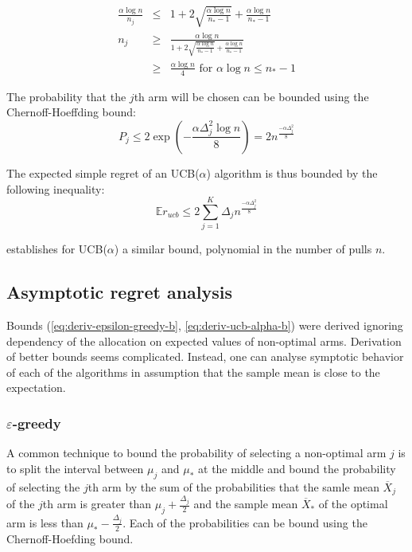 \documentclass{article}
\newcommand {\IE} {\ensuremath {\mathbb{E}}}
\begin{document}
\begin{eqnarray}
\frac {\alpha \log n} {n_j}&\le& 1 + 2  \sqrt {\frac {\alpha \log n}
  {n_*-1}} + \frac {\alpha \log n} {n_*-1}\nonumber\\
n_j &\ge& \frac {\alpha \log n} {1+2 \sqrt {\frac {\alpha \log n}
    {n_*-1}} + \frac {\alpha \log n} {n_*-1}}\nonumber\\
    &\ge& \frac {\alpha \log n} {4} \mbox{ for } \alpha \log n \le n_*-1
\end{eqnarray}

The probability that the $j$th arm will be chosen can be bounded using
the Chernoff-Hoeffding bound:
\begin{equation}
P_j \le 2 \exp\left(-\frac {\alpha \Delta_j^2 \log n} 8 \right) = 2n^{\frac {-\alpha \Delta_j^2} 8}
\end{equation}

The expected simple regret of an UCB($\alpha$) algorithm is thus
bounded by the following inequality:
\begin{equation}
\IE r_{ucb} \le 2\sum_{j=1}^K \Delta_jn^{\frac {-\alpha \Delta_j^2} 8}
\label{eq:deriv-ucb-alpha-b}
\end{equation}

\cite{Bubeck.pure} establishes for UCB($\alpha$) a similar bound,
polynomial in the number of pulls $n$.

\subsection{Asymptotic regret analysis}
\label{app:derivations-asym}

Bounds (\ref{eq:deriv-epsilon-greedy-b}, \ref{eq:deriv-ucb-alpha-b}) were
derived ignoring dependency of the allocation on expected values
of non-optimal arms. Derivation of better bounds seems
complicated. Instead, one can analyse symptotic behavior of each of the
algorithms in assumption that the sample mean is close to the expectation.

\subsubsection{$\varepsilon$-greedy}
\label{app:derivations-asym-eps}


A common technique \cite{Auer.ucb} to bound the probability of
selecting a non-optimal arm $j$ is to split the interval between
$\mu_j$ and $\mu_*$ at the middle and bound the probability of
selecting the $j$th arm by the sum of the probabilities that the samle
mean $\overline X_j$ of the $j$th arm is greater than $\mu_j+\frac
{\Delta_j} 2$ and the sample mean $\overline X_*$ of the optimal arm is
less than $\mu_*- \frac {\Delta_j} 2$. Each of the probabilities can
be bound using the Chernoff-Hoefding bound.
\end{document}
